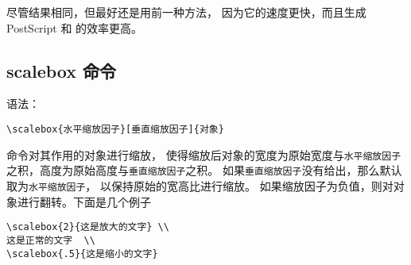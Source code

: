 尽管结果相同，但最好还是用前一种方法，
因为它的速度更快，而且生成 PostScript 和  的效率更高。

\subsection{scalebox 命令}\label{ssec:scalebox}
语法：
\begin{lstlisting}
\scalebox{水平缩放因子}[垂直缩放因子]{对象}
\end{lstlisting}

 命令对其作用的对象进行缩放，
使得缩放后对象的宽度为原始宽度与\texttt{水平缩放因子}之积，高度为原始高度与\texttt{垂直缩放因子}之积。
如果\texttt{垂直缩放因子}没有给出，那么默认取为\texttt{水平缩放因子}，
以保持原始的宽高比进行缩放。
如果缩放因子为负值，则对对象进行翻转。下面是几个例子

\begin{center}
\begin{minipage}[b]{.5\textwidth}
	\begin{center}
	\end{center}
	\par\vspace{0pt}
\end{minipage}%
\begin{minipage}[b]{.5\textwidth}
\begin{lstlisting}
\scalebox{2}{这是放大的文字} \\
这是正常的文字  \\
\scalebox{.5}{这是缩小的文字}
\end{lstlisting}
\par\vspace{0pt}
\end{minipage}
\end{center}

